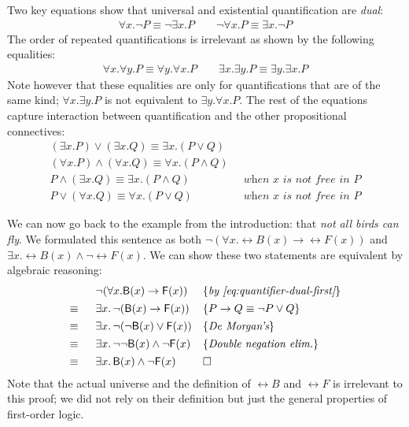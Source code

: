 Two key equations show that universal and existential
quantification are \emph{dual}:
%
\begin{align}
  \label{eq:quantifier-dual-first}
  \forall x . \neg P \equiv \neg \exists x . P
  \qquad
   \neg \forall x . P \equiv \exists x . \neg P
\end{align}
%
The order of repeated quantifications is irrelevant as shown by
the following equalities:
%
\begin{align}
  \forall x . \forall y. P \equiv \forall y . \forall x . P
  \qquad
  \exists x . \exists y . P \equiv \exists y . \exists x . P
\end{align}
%
Note however that these equalities are only for quantifications that
are of the same kind; $\forall x . \exists y . P$ is not equivalent to
$\exists y . \forall x . P$.
The rest of the equations capture interaction between quantification
and the other propositional connectives:
%
\begin{align}
  (\exists x . P) \vee (\exists x . Q) \equiv \exists x . (P \vee Q) \\
  (\forall x . P) \wedge (\forall x . Q) \equiv \forall x . (P \wedge
                                                                       Q) \\
  P \wedge (\exists x . Q) \equiv \exists x . (P \wedge Q) & \;\; \textit{when $x$ is  not free in $P$} \\
  P \vee (\forall x . Q) \equiv \forall x . (P \vee Q) & \;\;
 \textit{when $x$ is  not free in $P$}
\end{align}
\vspace{-2em}
\begin{example}
  We can now go back to the example from the introduction: that
  \emph{not all birds can fly}. We formulated this sentence as both
  $\neg (\forall x . \rel{B}(x) \rightarrow \rel{F}(x))$ and
  $\exists x . \rel{B}(x) \wedge \neg \rel{F}(x)$.
  We can show these two statements are equivalent by algebraic
  reasoning:
%
\begin{align*}
\begin{array}{rll}
    & \neg (\forall x . \mathsf{B}(x) \rightarrow \mathsf{F}(x)) & \{\textit{by \eqref{eq:quantifier-dual-first}}\} \\[0.4em]
  \equiv \;\; &  \exists x . \, \neg (\mathsf{B}(x) \rightarrow
                \mathsf{F}(x)) & \{\textit{$P \rightarrow Q \equiv \neg P
                              \vee Q$}\} \\[0.4em]
  \equiv \;\; & \exists x . \,\neg (\neg \mathsf{B}(x) \vee \mathsf{F}(x))
& \{\textit{De Morgan's}\} \\[0.4em]
  \equiv \;\; & \exists x . \,\neg \neg \mathsf{B}(x) \wedge \neg
                \mathsf{F}(x)
& \{\textit{Double negation elim.}\} \\[0.4em]
  \equiv \;\; & \exists x . \,\mathsf{B}(x) \wedge \neg \mathsf{F}(x) & \Box
\end{array}
\end{align*}
  Note that the actual universe and the definition of $\rel{B}$ and
  $\rel{F}$ is irrelevant to this proof; we did not rely on their
  definition but just the general properties of first-order logic.
\end{example}

